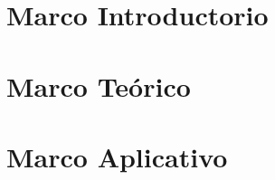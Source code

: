 \documentclass[letterpaper, oneside, 12pt]{book}
\begin{document}
	\frontmatter
		\tableofcontents
	\mainmatter
		\part{Marco Introductorio}
		
		\part{Marco Te\'orico}
		
		
		\part{Marco Aplicativo}
		
		
		
	\backmatter
		
		
\end{document}
